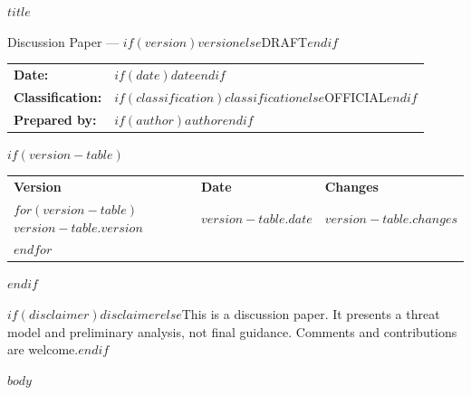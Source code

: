 \documentclass[a4paper,11pt]{report}
\renewcommand{\toprule}{\hline\noalign{\smallskip}}
\renewcommand{\midrule}{\noalign{\smallskip}\hline\noalign{\smallskip}}
\renewcommand{\bottomrule}{\noalign{\smallskip}\hline}
\begin{document}
\begin{titlepage}
\thispagestyle{titlepage}
\vspace*{1.5cm}

{\Huge\bfseries\color{dtanavy} $title$\par}

\vspace{0.8cm}

{\Large Discussion Paper --- $if(version)$$version$$else$DRAFT$endif$\par}

\vspace{1cm}

\begin{tabular}{@{}ll@{}}
\textbf{Date:}            & $if(date)$$date$$endif$ \\
\textbf{Classification:}  & $if(classification)$$classification$$else$OFFICIAL$endif$ \\
\textbf{Prepared by:}     & $if(author)$$author$$endif$ \\
\end{tabular}

$if(version-table)$
\vspace{0.8cm}

{\small
\begin{tabular}{@{}llp{8cm}@{}}
\toprule
\textbf{Version} & \textbf{Date} & \textbf{Changes} \\
\midrule
$for(version-table)$
$version-table.version$ & $version-table.date$ & $version-table.changes$ \\
$endfor$
\bottomrule
\end{tabular}
}
$endif$

\vfill

{\small\color{dtabody}
$if(disclaimer)$$disclaimer$$else$This is a discussion paper. It presents a threat model and preliminary analysis, not final guidance. Comments and contributions are welcome.$endif$
}

\end{titlepage}

\setcounter{page}{1}
\tableofcontents
\clearpage


$body$
\end{document}
